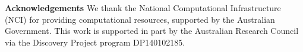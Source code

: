 \textbf{Acknowledgements} 
We thank the National Computational Infrastructure (NCI) for providing computational resources, supported by the Australian Government. 
This work is supported in part by the Australian Research Council via the Discovery Project program DP140102185.
